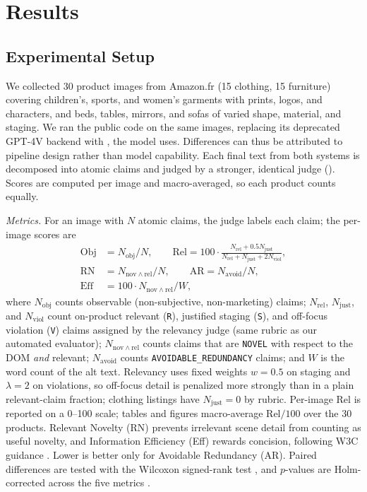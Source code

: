 \section{Results}\label{sec:results}
\subsection{Experimental Setup}
We collected 30 product images from Amazon.fr (15 clothing, 15 furniture) covering children's, sports, and women's garments with prints, logos, and characters, and beds, tables, mirrors, and sofas of varied shape, material, and staging. We ran the public \base code \cite{mohanbabu2024} on the same images, replacing its deprecated GPT-4V backend with \gen, the model \sys uses. Differences can thus be attributed to pipeline design rather than model capability. Each final text from both systems is decomposed into atomic claims and judged by a stronger, identical judge (\judge). Scores are computed per image and macro-averaged, so each product counts equally.

\textit{Metrics.} For an image with $N$ atomic claims, the judge labels each claim; the per-image scores are
\begin{align}
\mathrm{Obj} &= N_{\mathrm{obj}}/N, \qquad \mathrm{Rel} = 100\cdot\frac{N_{\mathrm{rel}}+0.5N_{\mathrm{just}}}{N_{\mathrm{rel}}+N_{\mathrm{just}}+2N_{\mathrm{viol}}}, \label{eq:objrel}\\
\mathrm{RN} &= N_{\mathrm{nov}\wedge\mathrm{rel}}/N, \qquad \mathrm{AR} = N_{\mathrm{avoid}}/N, \label{eq:nov}\\
\mathrm{Eff} &= 100\cdot N_{\mathrm{nov}\wedge\mathrm{rel}}/W, \label{eq:eff}
\end{align}
where $N_{\mathrm{obj}}$ counts observable (non-subjective, non-marketing) claims; $N_{\mathrm{rel}}$, $N_{\mathrm{just}}$, and $N_{\mathrm{viol}}$ count on-product relevant (\texttt{R}), justified staging (\texttt{S}), and off-focus violation (\texttt{V}) claims assigned by the relevancy judge (same rubric as our automated evaluator); $N_{\mathrm{nov}\wedge\mathrm{rel}}$ counts claims that are \texttt{NOVEL} with respect to the DOM \emph{and} relevant; $N_{\mathrm{avoid}}$ counts \texttt{AVOIDABLE\_REDUNDANCY} claims; and $W$ is the word count of the alt text. Relevancy uses fixed weights $w=0.5$ on staging and $\lambda=2$ on violations, so off-focus detail is penalized more strongly than in a plain relevant-claim fraction; clothing listings have $N_{\mathrm{just}}=0$ by rubric. Per-image $\mathrm{Rel}$ is reported on a 0--100 scale; tables and figures macro-average $\mathrm{Rel}/100$ over the 30 products. Relevant Novelty (RN) prevents irrelevant scene detail from counting as useful novelty, and Information Efficiency (Eff) rewards concision, following W3C guidance \cite{w3ctips}. Lower is better only for Avoidable Redundancy (AR). Paired differences are tested with the Wilcoxon signed-rank test \cite{wilcoxon1945}, and $p$-values are Holm-corrected across the five metrics \cite{holm1979}.
